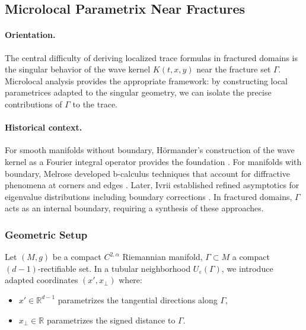 \subsection{Microlocal Parametrix Near Fractures}

\paragraph{Orientation.}
The central difficulty of deriving localized trace formulas in fractured domains
is the singular behavior of the wave kernel $K(t,x,y)$ near the fracture set $\Gamma$.
Microlocal analysis provides the appropriate framework: by constructing
local parametrices adapted to the singular geometry, we can isolate the precise
contributions of $\Gamma$ to the trace.

\paragraph{Historical context.}
For smooth manifolds without boundary, Hörmander’s construction of the wave kernel
as a Fourier integral operator provides the foundation \cite{hormander1971fourier}.
For manifolds with boundary, Melrose developed b-calculus techniques
that account for diffractive phenomena at corners and edges \cite{melrose1983scattering}.
Later, Ivrii established refined asymptotics for eigenvalue distributions
including boundary corrections \cite{ivrii1980second}.
In fractured domains, $\Gamma$ acts as an internal boundary, requiring
a synthesis of these approaches.


\subsubsection{Geometric Setup}

Let $(M,g)$ be a compact $C^{2,\alpha}$ Riemannian manifold, $\Gamma \subset M$
a compact $(d-1)$-rectifiable set. In a tubular neighborhood $U_\varepsilon(\Gamma)$,
we introduce adapted coordinates $(x',x_\perp)$ where:
\begin{itemize}
\item $x' \in \mathbb{R}^{d-1}$ parametrizes the tangential directions along $\Gamma$,
\item $x_\perp \in \mathbb{R}$ parametrizes the signed distance to $\Gamma$.
\end{itemize}

